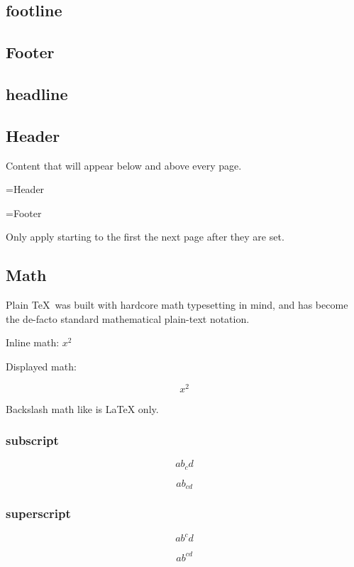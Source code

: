   \subsection{footline}

  \subsection{Footer}

  \subsection{headline}

  \subsection{Header}

    Content that will appear below and above every page.

    \headline={Header}

    \footline={Footer}

    Only apply starting to the first the next page after they are set.

  \subsection{Math}

    Plain \TeX\ was built with hardcore math typesetting in mind, and has become the de-facto standard mathematical plain-text notation.

    Inline math: $x^2$

    Displayed math:

    $$x^2$$

    Backslash math like \bs [ \bs ] is LaTeX only.

    \subsubsection{subscript}

      $$ ab_cd $$

      $$ ab_{cd} $$

    \subsubsection{superscript}

      $$ ab^cd $$

      $$ ab^{cd} $$

